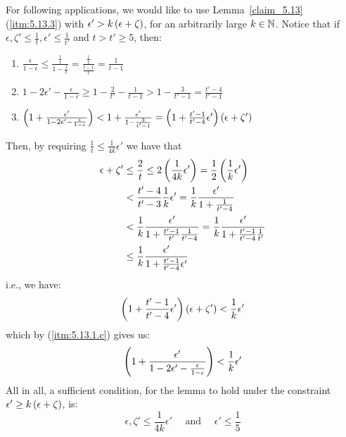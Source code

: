     \begin{remark}[Remark 5.13.1]\label{remark_5.13.1}
        For following applications, we would like to use Lemma~\ref{claim_5.13} (\ref{itm:5.13.3}) with
        $\epsilon' > k \left( \epsilon + \zeta \right)$, for an arbitrarily large $k \in \mathbb{N}$.
        Notice that if $\epsilon, \zeta' \leq \frac{1}{t}, \epsilon' \leq \frac{1}{t'}$ and $t > t' \geq 5$, then:
        \begin{enumerate}[label=(\alph*), ref=\alph*]
            \item $\frac{\epsilon}{1-\epsilon} \leq \frac{\frac{1}{t}}{1-\frac{1}{t}} = \frac{\frac{1}{t}}{\frac{t-1}{t}}
                = \frac{1}{t-1}$
            \item $1 - 2 \epsilon' - \frac{\epsilon}{1-\epsilon} \geq 1 - \frac{2}{t'} - \frac{1}{t-1} > 1 - \frac{3}{t'-1}
                = \frac{t'-4}{t'-1}$
            \item\label{itm:5.13.1.c} $\left( 1 + \frac{\epsilon'}{1 - 2 \epsilon' - \frac{\epsilon}{1-\epsilon}} \right)
                < 1 + \frac{\epsilon'}{1 - \frac{3}{t'-1}}
                = \left( 1 + \frac{t'-1}{t'-4} \epsilon' \right) \left( \epsilon + \zeta' \right)$
        \end{enumerate}
        Then, by requiring $\frac{1}{t} \leq \frac{1}{4k}\epsilon'$ we have that
        \begin{align*}
            \epsilon + \zeta'
                & \leq \frac{2}{t} \leq 2 \left( \frac{1}{4k}\epsilon' \right) = \frac{1}{2} \left( \frac{1}{k}\epsilon' \right) \\
                & < \frac{t'-4}{t'- 3} \frac{1}{k} \epsilon' = \frac{1}{k} \frac{\epsilon'}{1 + \frac{1}{t'-4}} \\
                & < \frac{1}{k} \frac{\epsilon'}{1 + \frac{t'-1}{t'}\frac{1}{t'-4}} = \frac{1}{k} \frac{\epsilon'}{1 + \frac{t'-1}{t'-4}\frac{1}{t'}} \\
                & \leq \frac{1}{k} \frac{\epsilon'}{1 + \frac{t'-1}{t'-4}\epsilon'}
        \end{align*}
        i.e., we have:
        $$
            \left( 1 + \frac{t'-1}{t'-4} \epsilon' \right) \left( \epsilon + \zeta' \right) < \frac{1}{k} \epsilon'
        $$
        which by (\ref{itm:5.13.1.c}) gives us:
        $$
            \left( 1 + \frac{\epsilon'}{1 - 2 \epsilon' - \frac{\epsilon}{1-\epsilon}} \right) < \frac{1}{k} \epsilon'
        $$
        All in all, a sufficient condition, for the lemma to hold under the constraint $\epsilon' \geq k \left( \epsilon + \zeta \right)$, is:
        $$
            \epsilon, \zeta' \leq \frac{1}{4k} \epsilon' \quad \text{ and } \quad \epsilon' \leq \frac{1}{5}
        $$
    \end{remark}

